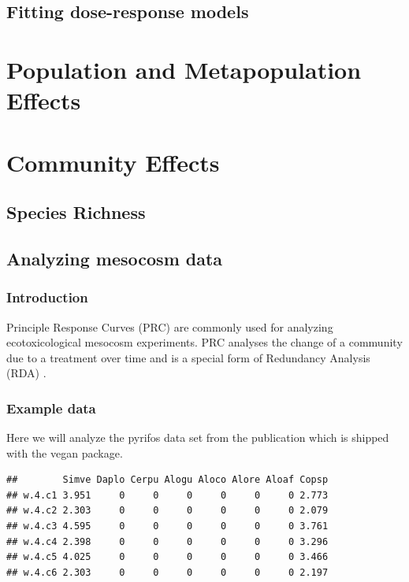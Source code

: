 \documentclass{tufte-book}\usepackage{knitr}
\begin{document}
\section{Fitting dose-response models}



\chapter{Population and Metapopulation Effects}



\chapter{Community Effects}

\section{Species Richness}

\section{Analyzing mesocosm data}
\subsection{Introduction}
Principle Response Curves (PRC)\cite{van_den_brink_principal_1999} are commonly
used for analyzing ecotoxicological mesocosm experiments. PRC analyses the 
change of a community due to a treatment over time and is a special form of 
Redundancy Analysis (RDA) \cite{legendre_numerical_2013}.


\subsection{Example data}
Here we will analyze the pyrifos data set from the publication
\cite{van_den_brink_principal_1999} which is shipped with the vegan package. 

\begin{knitrout}
\color{fgcolor}\begin{kframe}
\begin{alltt}
\hlstd{(pyrifos[,} \hlstd{(}\hlopt{:}\hlstd{)])}
\end{alltt}
\begin{verbatim}
##        Simve Daplo Cerpu Alogu Aloco Alore Aloaf Copsp
## w.4.c1 3.951     0     0     0     0     0     0 2.773
## w.4.c2 2.303     0     0     0     0     0     0 2.079
## w.4.c3 4.595     0     0     0     0     0     0 3.761
## w.4.c4 2.398     0     0     0     0     0     0 3.296
## w.4.c5 4.025     0     0     0     0     0     0 3.466
## w.4.c6 2.303     0     0     0     0     0     0 2.197
\end{verbatim}
\end{kframe}
\end{knitrout}
\end{document}
